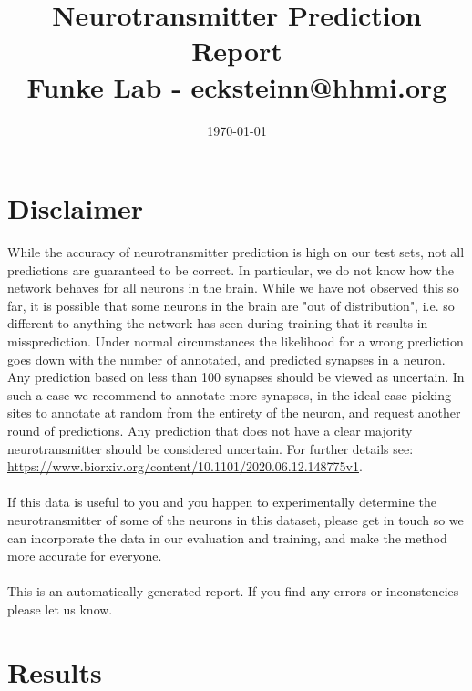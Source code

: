 \documentclass[a4paper,10pt]{article}
\begin{document}
   \title{Neurotransmitter Prediction Report\\ \small{Funke Lab - ecksteinn@hhmi.org}}
   \date{\today}
   \maketitle
   \section{Disclaimer}
   While the accuracy of neurotransmitter prediction is high on our test sets, not all predictions are guaranteed to be correct. In particular, we do not know how the network behaves for all neurons in the brain. While we have not observed this so far, 
   it is possible that some neurons in the brain are "out of distribution", i.e. so different to anything the network has seen during training that it results in missprediction.  
   Under normal circumstances the likelihood for a wrong prediction goes down with the number of annotated, and predicted synapses in a neuron. Any prediction based on less than 100 synapses should be
   viewed as uncertain. In such a case we recommend to annotate more synapses, in the ideal case picking sites to annotate at random from the entirety of the neuron, and request another round of predictions. Any prediction that does not have a clear majority neurotransmitter should be considered uncertain.  For further details see: \url{https://www.biorxiv.org/content/10.1101/2020.06.12.148775v1}. \\ \\
   If this data is useful to you and you happen to experimentally determine the neurotransmitter of some of the neurons in this dataset, please get in touch so we can incorporate the data in our evaluation and training, and make the method more accurate for everyone.\\ \\ This is an automatically
   generated report. If you find any errors or inconstencies please let us know.
  \section{Results}
    \centering
   
\end{document}
